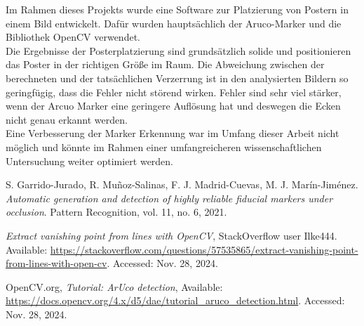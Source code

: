 \documentclass[a4paper,twocolumn]{article}
\begin{document}
Im Rahmen dieses Projekts wurde eine Software zur Platzierung von Postern in einem Bild entwickelt. Dafür wurden hauptsächlich der Aruco-Marker und die Bibliothek OpenCV verwendet.
\\
Die Ergebnisse der Posterplatzierung sind grundsätzlich solide und positionieren das Poster in der richtigen Größe im Raum. Die Abweichung zwischen der berechneten und der tatsächlichen Verzerrung ist in den analysierten Bildern so geringfügig, dass die Fehler nicht störend wirken. Fehler sind sehr viel stärker, wenn der Arcuo Marker eine geringere Auflösung hat und deswegen die Ecken nicht genau erkannt werden.
\\
Eine Verbesserung der Marker Erkennung war im Umfang dieser Arbeit nicht möglich und könnte im Rahmen einer umfangreicheren wissenschaftlichen Untersuchung weiter optimiert werden.


\begin{thebibliography}{9}

    S. Garrido-Jurado, R. Muñoz-Salinas, F. J. Madrid-Cuevas, M. J. Marín-Jiménez. 
    \textit{Automatic generation and detection of highly reliable fiducial markers under occlusion}. 
    Pattern Recognition, vol. 11, no. 6, 2021.
    
    \textit{Extract vanishing point from lines with OpenCV}, 
    StackOverflow user Ilke444. Available: \url{https://stackoverflow.com/questions/57535865/extract-vanishing-point-from-lines-with-open-cv}. 
    Accessed: Nov. 28, 2024.

    OpenCV.org, 
    \textit{Tutorial: ArUco detection}, 
    Available: \url{https://docs.opencv.org/4.x/d5/dae/tutorial_aruco_detection.html}. 
    Accessed: Nov. 28, 2024.

\end{thebibliography}

\end{document}
